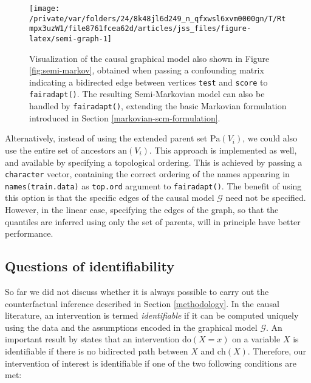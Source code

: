 \documentclass[
  nojss]{jss}
\begin{document}
\begin{CodeChunk}
\begin{figure}

{\centering \texttt{[image: /private/var/folders/24/8k48jl6d249\_n\_qfxwsl6xvm0000gn/T/Rtmpx3uzW1/file8761fcea62d/articles/jss\_files/figure-latex/semi-graph-1]} 

}

\caption{Visualization of the causal graphical model also shown in Figure \ref{fig:semi-markov}, obtained when passing a confounding matrix indicating a bidirected edge between vertices \texttt{test} and \texttt{score} to \texttt{fairadapt()}. The resulting Semi-Markovian model can also be handled by \texttt{fairadapt()}, extending the basic Markovian formulation introduced in Section \ref{markovian-scm-formulation}.}\label{fig:semi-graph}
\end{figure}
\end{CodeChunk}

Alternatively, instead of using the extended parent set
\(\mathrm{Pa}(V_i)\), we could also use the entire set of ancestors
\(\mathrm{an}(V_i)\). This approach is implemented as well, and
available by specifying a topological ordering. This is achieved by
passing a \texttt{character} vector, containing the correct ordering of
the names appearing in \texttt{names(train.data)} as \texttt{top.ord}
argument to \texttt{fairadapt()}. The benefit of using this option is
that the specific edges of the causal model \(\mathcal{G}\) need not be
specified. However, in the linear case, specifying the edges of the
graph, so that the quantiles are inferred using only the set of parents,
will in principle have better performance.

\hypertarget{questions-of-identifiability}{%
\subsection{Questions of
identifiability}\label{questions-of-identifiability}}

So far we did not discuss whether it is always possible to carry out the
counterfactual inference described in Section \ref{methodology}. In the
causal literature, an intervention is termed \emph{identifiable} if it
can be computed uniquely using the data and the assumptions encoded in
the graphical model \(\mathcal{G}\). An important result by
\cite{tian2002general} states that an intervention do\((X = x)\) on a
variable \(X\) is identifiable if there is no bidirected path between
\(X\) and \(\mathrm{ch}(X)\). Therefore, our intervention of interest is
identifiable if one of the two following conditions are met:
\end{document}
